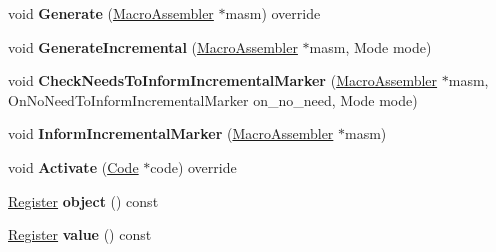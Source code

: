 \begin{DoxyCompactItemize}
\item 
void {\bfseries Generate} (\hyperlink{classv8_1_1internal_1_1_macro_assembler}{Macro\+Assembler} $\ast$masm) override\hypertarget{classv8_1_1internal_1_1_record_write_stub_a71cb55552be288a12876045441a66dca}{}\label{classv8_1_1internal_1_1_record_write_stub_a71cb55552be288a12876045441a66dca}

\item 
void {\bfseries Generate\+Incremental} (\hyperlink{classv8_1_1internal_1_1_macro_assembler}{Macro\+Assembler} $\ast$masm, Mode mode)\hypertarget{classv8_1_1internal_1_1_record_write_stub_a05cf08ed0350334ba02a2e918b42ffcc}{}\label{classv8_1_1internal_1_1_record_write_stub_a05cf08ed0350334ba02a2e918b42ffcc}

\item 
void {\bfseries Check\+Needs\+To\+Inform\+Incremental\+Marker} (\hyperlink{classv8_1_1internal_1_1_macro_assembler}{Macro\+Assembler} $\ast$masm, On\+No\+Need\+To\+Inform\+Incremental\+Marker on\+\_\+no\+\_\+need, Mode mode)\hypertarget{classv8_1_1internal_1_1_record_write_stub_aa80cd82bd6fa0cdc17b5cb2d17540d59}{}\label{classv8_1_1internal_1_1_record_write_stub_aa80cd82bd6fa0cdc17b5cb2d17540d59}

\item 
void {\bfseries Inform\+Incremental\+Marker} (\hyperlink{classv8_1_1internal_1_1_macro_assembler}{Macro\+Assembler} $\ast$masm)\hypertarget{classv8_1_1internal_1_1_record_write_stub_a18e17a353df1617947581e3e6b9e9183}{}\label{classv8_1_1internal_1_1_record_write_stub_a18e17a353df1617947581e3e6b9e9183}

\item 
void {\bfseries Activate} (\hyperlink{classv8_1_1internal_1_1_code}{Code} $\ast$code) override\hypertarget{classv8_1_1internal_1_1_record_write_stub_aee832e64590d152a601ed41c5e4fdac9}{}\label{classv8_1_1internal_1_1_record_write_stub_aee832e64590d152a601ed41c5e4fdac9}

\item 
\hyperlink{structv8_1_1internal_1_1_register}{Register} {\bfseries object} () const \hypertarget{classv8_1_1internal_1_1_record_write_stub_a6d3a7affc9526b332c46fbe8f54f0b19}{}\label{classv8_1_1internal_1_1_record_write_stub_a6d3a7affc9526b332c46fbe8f54f0b19}

\item 
\hyperlink{structv8_1_1internal_1_1_register}{Register} {\bfseries value} () const \hypertarget{classv8_1_1internal_1_1_record_write_stub_a7c90bc874fcf5f031f8b923b09dee7ad}{}\label{classv8_1_1internal_1_1_record_write_stub_a7c90bc874fcf5f031f8b923b09dee7ad}


\end{DoxyCompactItemize}
